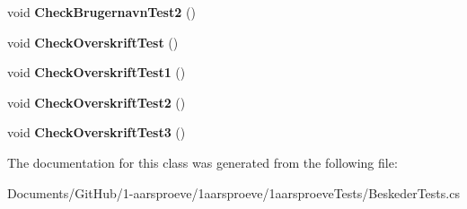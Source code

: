 \begin{DoxyCompactItemize}
\item 
\hypertarget{class__1aarsproeve_tests_1_1_beskeder_tests_ac1e31fb7754f6447173b6ce4419f3ad6}{}void {\bfseries Check\+Brugernavn\+Test2} ()\label{class__1aarsproeve_tests_1_1_beskeder_tests_ac1e31fb7754f6447173b6ce4419f3ad6}

\item 
\hypertarget{class__1aarsproeve_tests_1_1_beskeder_tests_a954cde8ed5c377f48d789b62f39f3002}{}void {\bfseries Check\+Overskrift\+Test} ()\label{class__1aarsproeve_tests_1_1_beskeder_tests_a954cde8ed5c377f48d789b62f39f3002}

\item 
\hypertarget{class__1aarsproeve_tests_1_1_beskeder_tests_af62386631da03f574b14c45540eef027}{}void {\bfseries Check\+Overskrift\+Test1} ()\label{class__1aarsproeve_tests_1_1_beskeder_tests_af62386631da03f574b14c45540eef027}

\item 
\hypertarget{class__1aarsproeve_tests_1_1_beskeder_tests_afb39a7419f9b9c2296c56b886e937c65}{}void {\bfseries Check\+Overskrift\+Test2} ()\label{class__1aarsproeve_tests_1_1_beskeder_tests_afb39a7419f9b9c2296c56b886e937c65}

\item 
\hypertarget{class__1aarsproeve_tests_1_1_beskeder_tests_a8406aba23c7c546f0695457e535a3162}{}void {\bfseries Check\+Overskrift\+Test3} ()\label{class__1aarsproeve_tests_1_1_beskeder_tests_a8406aba23c7c546f0695457e535a3162}

\end{DoxyCompactItemize}


The documentation for this class was generated from the following file\+:\begin{DoxyCompactItemize}
\item 
Documents/\+Git\+Hub/1-\/aarsproeve/1aarsproeve/1aarsproeve\+Tests/Beskeder\+Tests.\+cs\end{DoxyCompactItemize}
